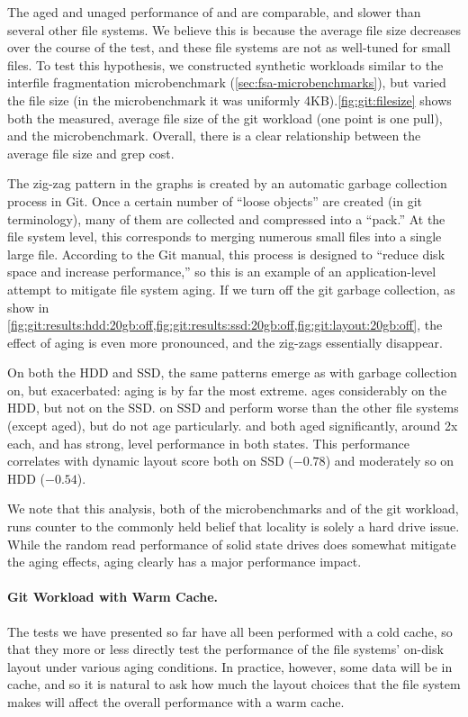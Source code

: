 The aged and unaged performance of \ext and \zfs are comparable, and slower
than several other file systems.  We believe this is because the average file
size decreases over the course of the test, and these file systems are not as
well-tuned for small files.  To test this hypothesis, we constructed synthetic
workloads similar to the interfile fragmentation microbenchmark
(\cref{sec:fsa-microbenchmarks}), but varied the file size (in the
microbenchmark it was uniformly 4KB).\cref{fig:git:filesize} shows both
the measured, average file size of the git workload (one point is one pull),
and the microbenchmark.  Overall, there is a clear relationship between the
average file size and grep cost. 



The zig-zag pattern in the graphs is created by an automatic garbage collection
process in Git. Once a certain number of ``loose objects'' are created (in git
terminology), many of them are collected and compressed into a ``pack.'' At the
file system level, this corresponds to merging numerous small files into a
single large file.  According to the Git manual, this process is designed to
``reduce disk space and increase performance,'' so this is an example of an
application-level attempt to mitigate file system aging. If we turn off the git
garbage collection, as show in
\cref{fig:git:results:hdd:20gb:off,fig:git:results:ssd:20gb:off,fig:git:layout:20gb:off},
the effect of aging is even more pronounced, and the zig-zags essentially
disappear.

On both the HDD and SSD, the same patterns emerge as with garbage collection
on, but exacerbated: \ftwofs aging is by far the most extreme.  \zfs ages
considerably on the HDD, but not on the SSD.  \zfs on SSD and \ext perform
worse than the other file systems (except \ftwofs aged), but do not age
particularly.  \xfs and \btrfs both aged significantly, around 2x each, and
\betrfs has strong, level performance in both states. This performance
correlates with dynamic layout score both on SSD ($-0.78$) and moderately so on
HDD ($-0.54$).

We note that this analysis, both of the microbenchmarks and of the git
workload, runs counter to the commonly held belief that locality is solely a
hard drive issue. While the random read performance of solid state drives does
somewhat mitigate the aging effects, aging clearly has a major performance
impact.

\paragraph{Git Workload with Warm Cache.} The tests we have presented so far
have all been performed with a cold cache, so that they more or less directly
test the performance of the file systems' on-disk layout under various aging
conditions. In practice, however, some data will be in cache, and so it is
natural to ask how much the layout choices that the file system makes will
affect the overall performance with a warm cache.

